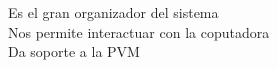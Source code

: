 \documentclass[preview]{standalone}
\begin{document}
Es el gran organizador del sistema\\Nos permite interactuar con la coputadora\\Da soporte a la PVM\\
\end{document}
